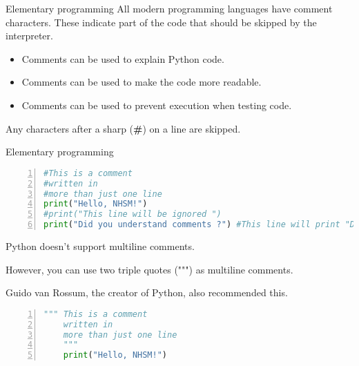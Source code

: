 \begin{frame}[fragile]{Elementary programming}
    All modern programming languages have comment characters. These indicate part of
    the code that should be skipped by the interpreter.
    \begin{itemize}[<+->]
        \item Comments can be used to explain Python code.

        \item Comments can be used to make the code more readable.
        
        \item Comments can be used to prevent execution when testing code.
    \end{itemize}
    \pause
    \begin{block}{}
        Any characters after a sharp ({\bf \#}) on a line are skipped.
    \end{block}

\end{frame}
\begin{frame}[fragile]{Elementary programming}
\begin{lstlisting}[numbers=left,showstringspaces=false,language=python]
#This is a comment
#written in
#more than just one line
print("Hello, NHSM!")
#print("This line will be ignored ")
print("Did you understand comments ?") #This line will print "Did ...?" 
\end{lstlisting}
\pause
{}
Python doesn't support multiline comments.

However, you can use two triple quotes (""") as multiline comments.

Guido van Rossum, the creator of Python, also recommended this.
\pause
\begin{lstlisting}[numbers=left,showstringspaces=false,language=python]
    """ This is a comment
    written in
    more than just one line
    """
    print("Hello, NHSM!")
\end{lstlisting}
\end{frame}
